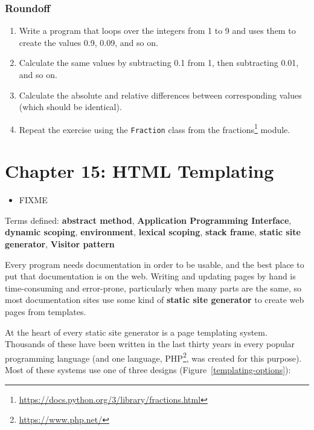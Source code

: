 \documentclass{scrbook}
\newcommand{\figref}[1]{Figure~\ref{#1}}
\newcommand{\glossref}[1]{\textbf{#1}}
\newcommand{\hreffoot}[2]{{#1}\footnote{\href{#2}{#2}}}
\begin{document}
\subsection*{Roundoff}

\begin{enumerate}

\item Write a program that loops over the integers from 1 to 9
    and uses them to create the values 0.9, 0.09, and so on.

\item Calculate the same values by subtracting 0.1 from 1,
    then subtracting 0.01,
    and so on.

\item Calculate the absolute and relative differences between corresponding values
    (which should be identical).

\item Repeat the exercise using the \texttt{Fraction} class
    from the \hreffoot{fractions}{https://docs.python.org/3/library/fractions.html} module.

\end{enumerate}

\chapter{Chapter 15: HTML Templating}\label{templating}

\begin{itemize}

\item FIXME

\end{itemize}


\noindent 
    Terms defined:
    \glossref{abstract method}, \glossref{Application Programming Interface}, \glossref{dynamic scoping}, \glossref{environment}, \glossref{lexical scoping}, \glossref{stack frame}, \glossref{static site generator}, \glossref{Visitor pattern}



Every program needs documentation in order to be usable,
and the best place to put that documentation is on the web.
Writing and updating pages by hand is time-consuming and error-prone,
particularly when many parts are the same,
so most documentation sites use some kind of
\glossref{static site generator}
to create web pages from templates.


At the heart of every static site generator is a page templating system.
Thousands of these have been written in the last thirty years
in every popular programming language
(and one language, \hreffoot{PHP}{https://www.php.net/}, was created for this purpose).
Most of these systems use one of three designs
(\figref{templating-options}):
\end{document}
